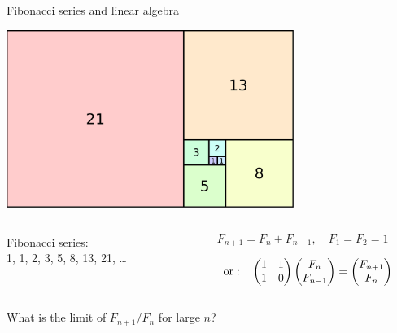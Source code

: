 \documentclass[svgnames]{beamer}
\begin{document}
\begin{frame}{Fibonacci series and linear algebra}
 \begin{center}
  \includegraphics[width=0.7\textwidth]{fibonacci}
 \end{center}

 \vspace{-0.3truecm}
 \begin{columns}[c]
  \begin{column}{0.5\textwidth}
   Fibonacci series:\\ 1, 1, 2, 3, 5, 8, 13, 21, \ldots
  \end{column}%
  \begin{column}{0.5\textwidth}
   \begin{displaymath}
    F_{n+1} = F_n + F_{n-1},\quad F_1 = F_2 = 1
   \end{displaymath}

   \vspace{-0.8truecm}
   \begin{displaymath}
    \strut\quad\mathrm{or:}\quad
    \begin{pmatrix} 1 & 1 \\ 1 & 0 \end{pmatrix} 
    \begin{pmatrix} F_n \\ F_{n-1} \end{pmatrix} =
    \begin{pmatrix} F_{n+1} \\ F_n \end{pmatrix}
   \end{displaymath}
  \end{column}
 \end{columns}

 \begin{center}
  What is the limit of $F_{n+1}/F_n$ for large $n$?
 \end{center}
\end{frame}
\end{document}
